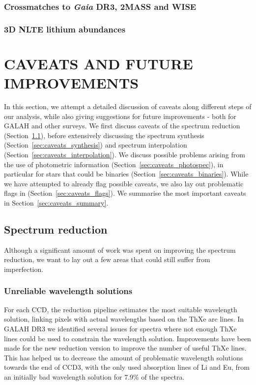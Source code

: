 \documentclass[
  journal=pasa,
  manuscript=research-paper, %
  year=2023,
  volume=37
]{cup-journal}
\newcommand{\Gaia}{\textit{Gaia}\xspace}
\begin{document}
\subsubsection{Crossmatches to \Gaia DR3, 2MASS and WISE}

\subsubsection{3D NLTE lithium abundances}

\section{CAVEATS AND FUTURE IMPROVEMENTS} \label{sec:caveats}

In this section, we attempt a detailed discussion of caveats along different steps of our analysis, while also giving suggestions for future improvements - both for GALAH and other surveys. We first discuss caveats of the spectrum reduction (Section~\ref{sec:caveats_reduction}), before extensively discussing the spectrum synthesis (Section~\ref{sec:caveats_synthesis}) and spectrum interpolation (Section~\ref{sec:caveats_interpolation}). We discuss possible problems arising from the use of photometric information (Section~\ref{sec:caveats_photospec}), in particular for stars that could be binaries (Section~\ref{sec:caveats_binaries}). While we have attempted to already flag possible caveats, we also lay out problematic flags in (Section~\ref{sec:caveats_flags}). We summarise the most important caveats in Section~\ref{sec:caveats_summary}.

\subsection{Spectrum reduction}  \label{sec:caveats_reduction}

Although a significant amount of work was spent on improving the spectrum reduction, we want to lay out a few areas that could still suffer from imperfection.

\subsubsection{Unreliable wavelength solutions}

For each CCD, the reduction pipeline estimates the most suitable wavelength solution, linking pixels with actual wavelengths based on the ThXe arc lines. In GALAH DR3 \citep{Buder2021} we identified several issues for spectra where not enough ThXe lines could be used to constrain the wavelength solution. Improvements have been made for the new reduction version to improve the number of useful ThXe lines. This has helped us to decrease the amount of problematic wavelength solutions towards the end of CCD3, with the only used absorption lines of Li and Eu, from an initially bad wavelength solution for 7.9\% of the spectra.
\end{document}
